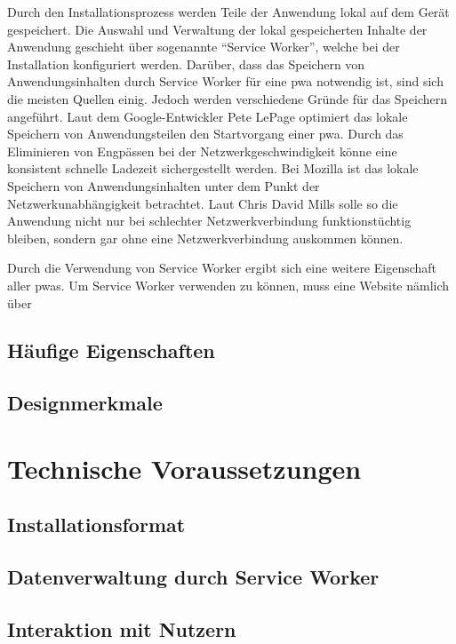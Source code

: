 \documentclass[11pt, parskip=half]{scrartcl}       %
\begin{document}
Durch den Installationsprozess werden Teile der Anwendung lokal auf dem Gerät gespeichert.
Die Auswahl und Verwaltung der lokal gespeicherten Inhalte der Anwendung geschieht über sogenannte \enquote{Service Worker}, welche bei der Installation konfiguriert werden.
Darüber, dass das Speichern von Anwendungsinhalten durch Service Worker für eine \ac{pwa} notwendig ist, sind sich die meisten Quellen einig.
Jedoch werden verschiedene Gründe für das Speichern angeführt.
Laut dem Google-Entwickler Pete LePage optimiert das lokale Speichern von Anwendungsteilen den Startvorgang einer \ac{pwa}.
Durch das Eliminieren von Engpässen bei der Netzwerkgeschwindigkeit könne eine konsistent schnelle Ladezeit sichergestellt werden.\cite{googledev_pwaondesktop}
Bei Mozilla ist das lokale Speichern von Anwendungsinhalten unter dem Punkt der Netzwerkunabhängigkeit betrachtet.
Laut Chris David Mills solle so die Anwendung nicht nur bei schlechter Netzwerkverbindung funktionstüchtig bleiben, sondern gar ohne eine Netzwerkverbindung auskommen können\cite{mozilladevs-pwaintroduction}.

Durch die Verwendung von Service Worker ergibt sich eine weitere Eigenschaft aller \acp{pwa}.
Um Service Worker verwenden zu können, muss eine Website nämlich über %


\subsection{Häufige Eigenschaften}

\subsection{Designmerkmale}


\section{Technische Voraussetzungen}

\subsection{Installationsformat}

\subsection{Datenverwaltung durch Service Worker}

\subsection{Interaktion mit Nutzern}
\end{document}
